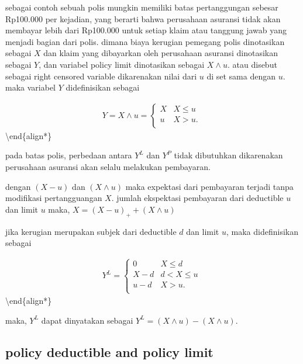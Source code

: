 \documentclass[
]{book}
\begin{document}
sebagai contoh sebuah polis mungkin memiliki batas pertanggungan sebesar Rp100.000 per kejadian, yang berarti bahwa perusahaan asuransi tidak akan membayar lebih dari Rp100.000 untuk setiap klaim atau tanggung jawab yang menjadi bagian dari polis.
dimana biaya kerugian pemegang polis dinotasikan sebagai \(X\) dan klaim yang dibayarkan oleh perusahaan asuransi dinotasikan sebagai \(Y\), dan variabel policy limit dinotasikan sebagai \(X \land u\). atau disebut sebagai right censored variable dikarenakan nilai dari \(u\) di set sama dengan \(u\). maka variabel \(Y\) didefinisikan sebagai

\begin{align*}
Y = X \land u = \left\{ \begin{matrix}
X & X \leq u \\
u & X > u. \\
\end{matrix} \right.\
\end{align*}\textbackslash end\{align*\}

pada batas polis, perbedaan antara \(Y^L\) dan \(Y^P\) tidak dibutuhkan dikarenakan perusahaan asuransi akan selalu melakukan pembayaran.

dengan \((X-u)\) dan \((X \land u)\) maka expektasi dari pembayaran terjadi tanpa modifikasi pertangguangan \(X\). jumlah ekspektasi pembayaran dari deductible \(u\) dan limit \(u\) maka, \(X=(X-u)_++(X\land u)\)

jika kerugian merupakan subjek dari deductible \(d\) dan limit \(u\), maka didefinisikan sebagai

\begin{align*}
Y^{L} = \left\{ \begin{matrix}
0 & X \leq d \\
X - d  & d <  X \leq u \\
 u - d  & X > u. \\
\end{matrix} \right.\
\end{align*}\textbackslash end\{align*\}

maka, \(Y^L\) dapat dinyatakan sebagai \(Y^L=(X\land u)-(X\land u)\).

\hypertarget{policy-deductible-and-policy-limit}{%
\subsection{policy deductible and policy limit}\label{policy-deductible-and-policy-limit}}
\end{document}
